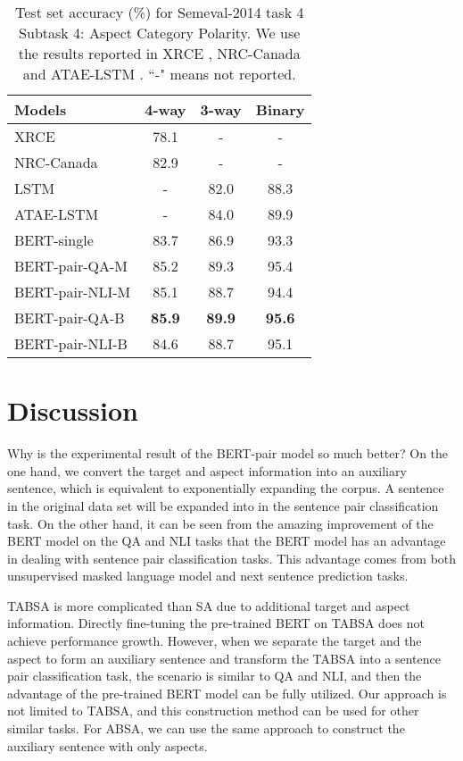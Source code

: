 \documentclass[11pt,a4paper]{article}
\theoremstyle{definition}
\begin{document}
	
	\begin{table}[t!]
		\centering
		\begin{tabular}{l c c c}
			\toprule
			Models & 4-way & 3-way & Binary  \\
			\midrule
			XRCE & 78.1 & - & - \\			
			NRC-Canada & 82.9 & - & - \\
			LSTM & - & 82.0 & 88.3 \\
			ATAE-LSTM & - & 84.0 & 89.9 \\
			\midrule
			BERT-single & 83.7 & 86.9 & 93.3 \\
			BERT-pair-QA-M & 85.2 & 89.3 & 95.4 \\
			BERT-pair-NLI-M & 85.1 & 88.7 & 94.4 \\
			BERT-pair-QA-B & \textbf{85.9} & \textbf{89.9} & \textbf{95.6} \\
			BERT-pair-NLI-B & 84.6 & 88.7 & 95.1 \\
			\bottomrule
		\end{tabular}
		\caption{\label{table_semeval_2014_4_4} Test set accuracy (\%) for Semeval-2014 task 4 Subtask 4: Aspect Category Polarity. We use the results reported in XRCE \cite{brun2014xrce}, NRC-Canada \cite{kiritchenko2014nrc} and ATAE-LSTM \cite{wang2016attention}. ``-" means not reported.
		}
	\end{table}
	
	
	\section{Discussion}
	
	Why is the experimental result of the BERT-pair model so much better? On the one hand, we convert the target and aspect information into an auxiliary sentence, which is equivalent to exponentially expanding the corpus. A sentence  in the original data set will be expanded into  in the sentence pair classification task. On the other hand, it can be seen from the amazing improvement of the BERT model on the QA and NLI tasks \cite{devlin2018bert} that the BERT model has an advantage in dealing with sentence pair classification tasks. This advantage comes from both unsupervised masked language model and next sentence prediction tasks.
	
	TABSA is more complicated than SA due to additional target and aspect information. Directly fine-tuning the pre-trained BERT on TABSA does not achieve performance growth. However, when we separate the target and the aspect to form an auxiliary sentence and transform the TABSA into a sentence pair classification task, the scenario is similar to QA and NLI, and then the advantage of the pre-trained BERT model can be fully utilized. Our approach is not limited to TABSA, and this construction method can be used for other similar tasks. For ABSA, we can use the same approach to construct the auxiliary sentence with only aspects.
	
\end{document}
